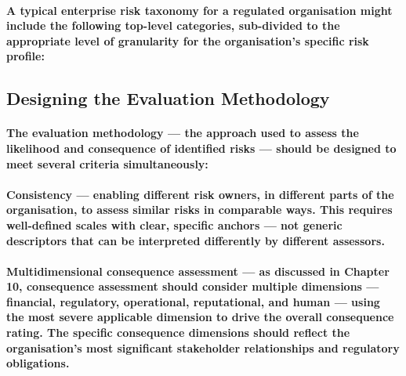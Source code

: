 \paragraph{A typical enterprise risk taxonomy for a regulated organisation might include the following top-level categories, sub-divided to the appropriate level of granularity for the organisation's specific risk profile:}
\begin{itemize}
\end{itemize}

\subsection{Designing the Evaluation Methodology}
\paragraph{The evaluation methodology — the approach used to assess the likelihood and consequence of identified risks — should be designed to meet several criteria simultaneously:}
\paragraph{\textbf{Consistency} — enabling different risk owners, in different parts of the organisation, to assess similar risks in comparable ways. This requires well-defined scales with clear, specific anchors — not generic descriptors that can be interpreted differently by different assessors.}
\paragraph{\textbf{Multidimensional consequence assessment} — as discussed in Chapter 10, consequence assessment should consider multiple dimensions — financial, regulatory, operational, reputational, and human — using the most severe applicable dimension to drive the overall consequence rating. The specific consequence dimensions should reflect the organisation's most significant stakeholder relationships and regulatory obligations.}
